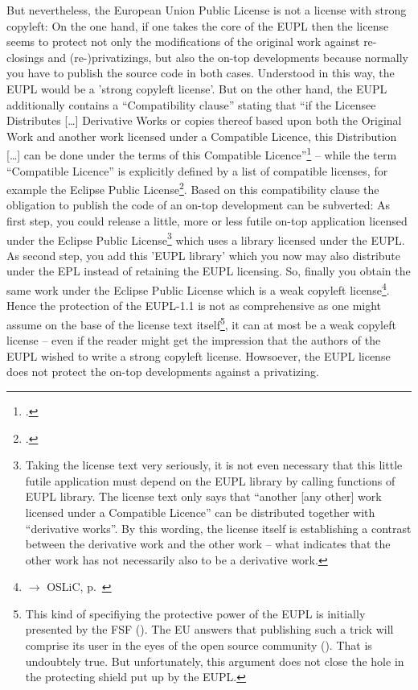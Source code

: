 But nevertheless, the European Union Public License is not a license with strong
copyleft: On the one hand, if one takes the core of the EUPL then the license
seems to protect not only the modifications of the original work against
re-closings and (re-)privatizings, but also the on-top developments because
normally you have to publish the source code in both cases. Understood in this
way, the EUPL would be a 'strong copyleft license'. But on the other hand, the
EUPL additionally contains a \enquote{Compatibility clause} stating that
\enquote{if the Licensee Distributes [\ldots] Derivative Works or copies thereof
based upon both the Original Work and another work licensed under a Compatible
Licence, this Distribution [\ldots] can be done under the terms of this
Compatible Licence}\footcite[cf.][\nopage wp.\ §5]{EuplLicense2007en} -- while
the term \enquote{Compatible Licence} is explicitly defined by a list of
compatible licenses, for example the Eclipse Public
License\footcite[cf.][\nopage wp.\ Appendix]{EuplLicense2007en}. Based on this
compatibility clause the obligation to publish the code of an on-top development
can be subverted: As first step, you could release a little, more or less futile
on-top application licensed under the Eclipse Public License\footnote{Taking the
license text very seriously, it is not even necessary that this little futile
application must depend on the EUPL library by calling functions of EUPL
library. The license text only says that \enquote{another [any other] work
licensed under a Compatible Licence} can be distributed together with
\enquote{derivative works}. By this wording, the license itself is
establishing a contrast between the derivative work and the other work -- what
indicates that the other work has not necessarily also to be a derivative work.}
which uses a library licensed under the EUPL. As second step, you add this 'EUPL
library' which you now may also distribute under the EPL instead of retaining
the EUPL licensing. So, finally you obtain the same work under the Eclipse
Public License which is a weak copyleft license\footnote{$\rightarrow$ OSLiC,
p.\ \pageref{sec:ProtectingPowerOfEpl}}. Hence the protection of the EUPL-1.1 is
not as comprehensive as one might assume on the base of the license text
itself\footnote{This kind of specifiying the protective power of the EUPL is
initially presented by the FSF (\cite[cf.][wp.\ section 'European Union
Public License']{FsfLicenseList2013a}). The EU answers that publishing such a
trick will comprise its user in the eyes of the open source community
(\cite[cf.][wp]{FsfEuplRecomment2013}). That is undoubtely true. But
unfortunately, this argument does not close the hole in the protecting shield
put up by the EUPL.}, it can at most be a weak copyleft license -- even if the
reader might get the impression that the authors of the EUPL wished to write a
strong copyleft license. Howsoever, the EUPL license does not protect the on-top
developments against a privatizing.

